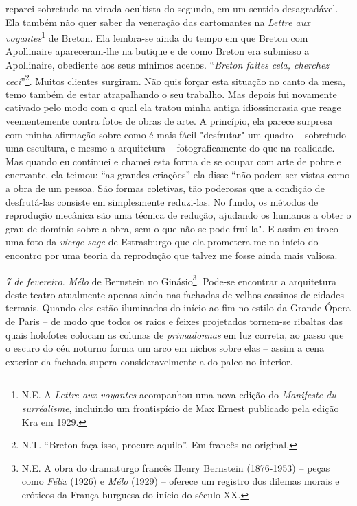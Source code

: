 reparei sobretudo na virada ocultista do segundo, em um sentido
desagradável. Ela também não quer saber da veneração das cartomantes na
\emph{Lettre aux voyantes}\footnote{N.E. A \emph{Lettre aux voyantes}
  acompanhou uma nova edição do \emph{Manifeste du surréalisme},
  incluindo um frontispício de Max Ernest publicado pela edição Kra em
  1929.} de Breton. Ela lembra-se ainda do tempo em que Breton com
Apollinaire apareceram-lhe na butique e de como Breton era submisso a
Apollinaire, obediente aos seus mínimos acenos. ``\emph{Breton faites
cela, cherchez ceci}''\footnote{N.T. ``Breton faça isso, procure
  aquilo''. Em francês no original.}. Muitos clientes surgiram. Não quis
forçar esta situação no canto da mesa, temo também de estar atrapalhando
o seu trabalho. Mas depois fui novamente cativado pelo modo com o qual
ela tratou minha antiga idiossincrasia que reage veementemente contra
fotos de obras de arte. A princípio, ela parece surpresa com minha
afirmação sobre como é mais fácil "desfrutar" um quadro -- sobretudo uma
escultura, e mesmo a arquitetura -- fotograficamente do que na
realidade. Mas quando eu continuei e chamei esta forma de se ocupar com
arte de pobre e enervante, ela teimou: ``as grandes criações'' ela disse
``não podem ser vistas como a obra de um pessoa. São formas coletivas,
tão poderosas que a condição de desfrutá-las consiste em simplesmente
reduzi-las. No fundo, os métodos de reprodução mecânica são uma técnica
de redução, ajudando os humanos a obter o grau de domínio sobre a obra,
sem o que não se pode fruí-la". E assim eu troco uma foto da
\emph{vierge sage} de Estrasburgo que ela prometera-me no início do
encontro por uma teoria da reprodução que talvez me fosse ainda mais
valiosa.

\emph{7 de fevereiro}. \emph{Mélo} de Bernstein no Ginásio\footnote{N.E.
  A obra do dramaturgo francês Henry Bernstein (1876-1953) -- peças como
  \emph{Félix} (1926) e \emph{Mélo} (1929) -- oferece um registro dos
  dilemas morais e eróticos da França burguesa do início do século XX.}.
Pode-se encontrar a arquitetura deste teatro atualmente apenas ainda nas
fachadas de velhos cassinos de cidades termais. Quando eles estão
iluminados do início ao fim no estilo da Grande Ópera de Paris -- de
modo que todos os raios e feixes projetados tornem-se ribaltas das quais
holofotes colocam as colunas de \emph{primadonnas} em luz correta, ao
passo que o escuro do céu noturno forma um arco em nichos sobre elas --
assim a cena exterior da fachada supera consideravelmente a do palco no
interior.


